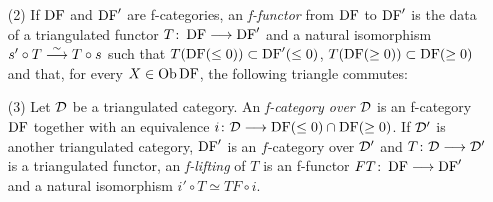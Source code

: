 \begin{definition}
\begin{itemize}
\item[(2)] If $\operatorname{DF}$ and $\operatorname{DF}'$ are f-categories, an \emph{f-functor} from $\operatorname{DF}$ to $\operatorname{DF}'$ is the data of a triangulated functor $T\colon \operatorname{DF}\longrightarrow\operatorname{DF}'$ and a natural isomorphism
$s'\circ T\stackrel{\sim}{\longrightarrow} T\circ s$ 
such that $T(\operatorname{DF}(\leq 0))\subset\operatorname{DF}'(\leq 0)$,
$T(\operatorname{DF}(\geq 0))\subset\operatorname{DF}(\geq 0)$ and that, for every $X\in\operatorname{\mathrm{Ob}}\operatorname{DF}$, the following triangle commutes:


\item[(3)] 
Let $\mathcal{D}$ be a triangulated category. An \emph{f-category over $\mathcal{D}$} is an f-category $\operatorname{DF}$ together with an equivalence $i\colon \mathcal{D}\longrightarrow\operatorname{DF}(\leq 0)\cap\operatorname{DF}(\geq 0)$.
If $\mathcal{D}'$ is another triangulated category, $\operatorname{DF}'$ is an $f$-category over $\mathcal{D}'$ and $T\colon \mathcal{D}\longrightarrow\mathcal{D}'$ is a triangulated functor, an \emph{f-lifting} of $T$ is an f-functor
$FT\colon \operatorname{DF}\longrightarrow\operatorname{DF}'$ and a natural isomorphism $i'\circ T\simeq TF\circ i$.

\end{itemize}
\label{def_f_category}
\end{definition}


